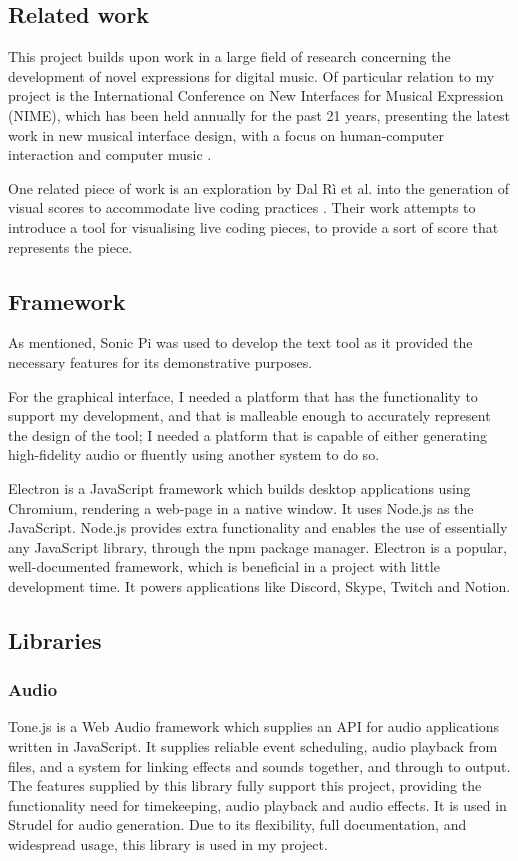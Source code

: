 \documentclass[12pt,a4paper,oneside,openright]{report}
\begin{document}
\subsection{Related work}
This project builds upon work in a large field of research concerning the development of novel expressions for digital music. Of particular relation to my project is the International Conference on New Interfaces for Musical Expression (NIME), which has been held annually for the past 21 years, presenting the latest work in new musical interface design, with a focus on human-computer interaction and computer music \cite{NIME}.

One related piece of work is an exploration by Dal R{\` i} et al. into the generation of visual scores to accommodate live coding practices \cite{Dal22}. Their work attempts to introduce a tool for visualising live coding pieces, to provide a sort of score that represents the piece.

\subsection{Framework}
As mentioned, Sonic Pi was used to develop the text tool as it provided the necessary features for its demonstrative purposes.

For the graphical interface, I needed a platform that has the functionality to support my development, and that is malleable enough to accurately represent the design of the tool; I needed a platform that is capable of either generating high-fidelity audio or fluently using another system to do so.

Electron is a JavaScript framework which builds desktop applications using Chromium, rendering a web-page in a native window. It uses Node.js as the JavaScript. Node.js provides extra functionality and enables the use of essentially any JavaScript library, through the npm package manager. Electron is a popular, well-documented framework, which is beneficial in a project with little development time. It powers applications like Discord, Skype, Twitch and Notion.

\subsection{Libraries}
\subsubsection{Audio}
Tone.js is a Web Audio framework which supplies an API for audio applications written in JavaScript. It supplies reliable event scheduling, audio playback from files, and a system for linking effects and sounds together, and through to output. The features supplied by this library fully support this project, providing the functionality need for timekeeping, audio playback and audio effects. It is used in Strudel for audio generation. Due to its flexibility, full documentation, and widespread usage, this library is used in my project.
\end{document}
